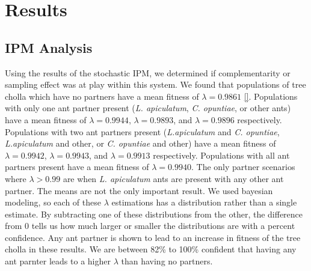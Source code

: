 \documentclass[11pt]{article}
\begin{document}
\section*{Results}
\subsection*{IPM Analysis}
Using the results of the stochastic IPM, we determined if complementarity or sampling effect was at play within this system. 
We found that populations of tree cholla which have no partners have a mean fitness of $\lambda = 0.9861$ \ref{}.
Populations with only one ant partner present (\textit{L. apiculatum}, \textit{C. opuntiae}, or other ants) have a mean fitness of $\lambda = 0.9944$, $\lambda = 0.9893$, and $\lambda =0.9896$ respectively.
Populations with two ant partners present (\textit{L.apiculatum} and \textit{C. opuntiae}, \textit{L.apiculatum} and other, or \textit{C. opuntiae} and other) have a mean fitness of $\lambda = 0.9942$, $\lambda = 0.9943$, and $\lambda = 0.9913$ respectively. 
Populations with all ant partners present have a mean fitness of $\lambda = 0.9940$.
The only partner scenarios where $\lambda > 0.99$ are when \textit{L. apiculatum} ants are present with any other ant partner. 
The means are not the only important result.
We used bayesian modeling, so each of these $\lambda$ estimations has a distribution rather than a single estimate.
By subtracting one of these distributions from the other, the difference from 0 tells us how much larger or smaller the distributions are with a percent confidence. 
Any ant partner is shown to lead to an increase in fitness of the tree cholla in these results. 
We are between 82\% to 100\% confident that having any ant parnter leads to a higher $\lambda$ than having no partners.
\end{document}

